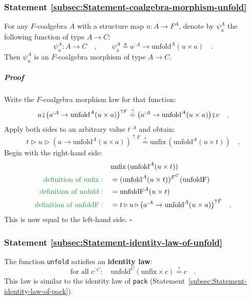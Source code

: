 \subsubsection{Statement \label{subsec:Statement-coalgebra-morphism-unfold}\ref{subsec:Statement-coalgebra-morphism-unfold}}

For any $F$-coalgebra $A$ with a structure map $u:A\rightarrow F^{A}$,
denote by $\psi_{u}^{A}$ the following function of type $A\rightarrow C$:
\[
\psi_{u}^{A}:A\rightarrow C\quad,\quad\quad\psi_{u}^{A}\triangleq a^{:A}\rightarrow\text{unfold}^{A}(u\times a)\quad.
\]
Then $\psi_{u}^{A}$ is an $F$-coalgebra morphism of type $A\rightarrow C$. 

\subparagraph{Proof}

Write the $F$-coalgebra morphism law for that function:
\[
u\bef\big(a^{:A}\rightarrow\text{unfold}^{A}(u\times a)\big)^{\uparrow F}\overset{?}{=}\big(a^{:A}\rightarrow\text{unfold}^{A}(u\times a)\big)\bef v\quad.
\]
Apply both sides to an arbitrary value $t^{:A}$ and obtain:
\[
t\triangleright u\triangleright(a\rightarrow\text{unfold}^{A}(u\times a))^{\uparrow F}\overset{?}{=}\text{unfix}\,(\text{unfold}^{A}(u\times t))\quad.
\]
Begin with the right-hand side:
\begin{align*}
 & \text{unfix}\,(\text{unfold}^{A}(u\times t))\\
{\color{greenunder}\text{definition of }\text{unfix}:}\quad & =(\text{unfold}^{A}(u\times t))^{F^{C}}(\text{unfoldF})\\
{\color{greenunder}\text{definition of }\text{unfold}:}\quad & =\text{unfoldF}^{A}(u\times t)\\
{\color{greenunder}\text{definition of }\text{unfoldF}:}\quad & =t\triangleright u\triangleright\big(a^{:A}\rightarrow\text{unfold}^{A}(u\times a)\big)^{\uparrow F}\quad.
\end{align*}
This is now equal to the left-hand side. $\square$

\subsubsection{Statement \label{subsec:Statement-identity-law-of-unfold}\ref{subsec:Statement-identity-law-of-unfold}}

The function \lstinline!unfold! satisfies an \textbf{identity law}:
\[
\text{for all }c^{:C}:\quad\text{unfold}^{C}(\text{unfix}\times c)\overset{?}{=}c\quad.
\]
This law is
similar to the identity law of \lstinline!pack! (Statement~\ref{subsec:Statement-identity-law-of-pack}).

